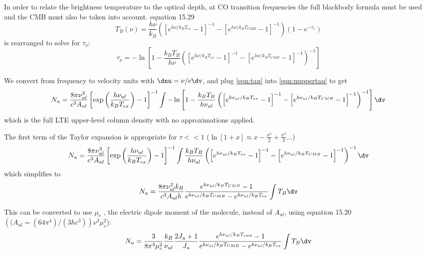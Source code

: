 In order to relate the brightness temperature to the optical depth, at CO transition frequencies the full blackbody
formula must be used and the CMB must also be taken into account.  \citet{rohlfs} equation 15.29 
\begin{equation} 
  \label{eqn:tbrightnesscmb}
  T_B(\nu) = \frac{h \nu}{k_B} \left(\left[e^{h \nu / k_B T_{ex}} - 1\right]^{-1} - \left[e^{h \nu / k_B T_{CMB}} - 1\right]^{-1} \right) (1-e^{-\tau_\nu})
\end{equation}
is rearranged to solve for $\tau_\nu$:
\begin{equation}
  \label{eqn:tau}
  \tau_\nu = -\ln\left[ 1 - \frac{k_B T_B}{h \nu} \left(\left[e^{h \nu / k_B T_{ex}} - 1\right]^{-1} - \left[e^{h \nu / k_B T_{CMB}} - 1\right]^{-1} \right)^{-1} \right]
\end{equation}

We convert from frequency to velocity units with $\dnu = \nu/c \dv$, and plug \eqref{eqn:tau} into \eqref{eqn:nuppertau} to get
\begin{equation}
  \label{eqn:nuppernoapprox}
  N_u = \frac{8\pi \nu_{ul}^3}{c^3 A_{ul}} \left[\exp\left(\frac{h \nu_{ul} }{k_B T_{ex}}\right) - 1 \right]^{-1} \int -\ln\left[ 1 - \frac{k_B T_B}{h \nu_{ul}} \left(\left[e^{h \nu_{ul} / k_B T_{ex}} - 1\right]^{-1} - \left[e^{h \nu_{ul} / k_B T_{CMB}} - 1\right]^{-1} \right)^{-1} \right] \dv
\end{equation}
which is the full LTE upper-level column density with no approximations applied.

The first term of the Taylor expansion is appropriate for $\tau<<1$ ($\ln[1+x]\approx x-\frac{x^2}{2}+\frac{x^3}{3}\ldots$)
\begin{equation}
  N_u = \frac{8\pi \nu_{ul}^3}{c^3 A_{ul}} \left[\exp\left(\frac{h \nu_{ul} }{k_B T_{ex}}\right) - 1 \right]^{-1} \int \frac{k_B T_B}{h \nu_{ul}} \left(\left[e^{h \nu_{ul} / k_B T_{ex}} - 1\right]^{-1} - \left[e^{h \nu_{ul} / k_B T_{CMB}} - 1\right]^{-1} \right)^{-1} \dv
\end{equation}
which simplifies to
\begin{equation}
  \label{eqn:nupper}
  N_u = \frac{8\pi \nu_{ul}^2 k_B}{c^3 A_{ul} h }  \frac{e^{h\nu_{ul}/k_B T_{CMB}} - 1}{e^{h\nu_{ul}/k_B T_{CMB}} - e^{h\nu_{ul}/k_B T_{ex}}} \int T_B  \dv
\end{equation}

This can be converted to use $\mu_e$ \citep[0.1222 for
\twelveco; ][]{Muenter1975}, the electric dipole moment of the molecule, instead
of $A_{ul}$, using \citet{rohlfs} equation 15.20 $\left((A_{ul}=(64\pi^4)/(3 h
c^3)\right)\nu^3 \mu_{e}^2$):
\begin{equation}
  \label{eqn:nuppermuju}
  N_u = \frac{3  }{8 \pi^3 \mu_e^2 } \frac{k_B}{\nu_{ul}} \frac{2 J_u + 1}{J_u} 
    \frac{e^{h\nu_{ul}/k_B T_{cmb}} - 1}{e^{h\nu_{ul}/k_B T_{CMB}} - e^{h\nu_{ul}/k_B T_{ex}}} \int T_B  \dv
\end{equation}

